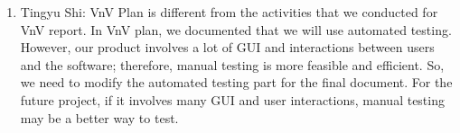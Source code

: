 \documentclass[12pt, titlepage]{article}
\begin{document}
\begin{enumerate}
    \item Tingyu Shi: VnV Plan is different from the activities that  we conducted
    for VnV report.  In VnV plan,
    we documented that we will use automated testing. However, our product 
    involves a lot of GUI and interactions between  users and the software; 
    therefore, manual testing is more feasible and efficient. So, we need to 
    modify the automated testing part for the final document. For the future project,
    if it involves many GUI and user interactions, manual testing may be a better
    way to test. 
\end{enumerate}
\end{document}

